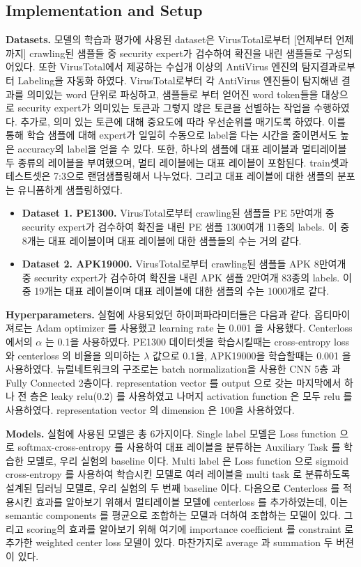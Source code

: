 \subsection{Implementation and Setup}
\textbf{Datasets. } 
모델의 학습과 평가에 사용된 dataset은 VirusTotal로부터 [언제부터 언제까지] crawling된 샘플들 중 security expert가 검수하여 확진을 내린 샘플들로 구성되어있다. 또한 VirusTotal에서 제공하는 수십개 이상의 AntiVirus 엔진의 탐지결과로부터 Labeling을 자동화 하였다. VirusTotal로부터 각 AntiVirus 엔진들이 탐지해낸 결과를 의미있는 word 단위로 파싱하고, 샘플들로 부터 얻어진 word token들을 대상으로 security expert가 의미있는 토큰과 그렇지 않은 토큰을 선별하는 작업을 수행하였다. 추가로, 의미 있는 토큰에 대해 중요도에 따라 우선순위를 매기도록 하였다. 이를 통해 학습 샘플에 대해 expert가 일일히 수동으로 label을 다는 시간을 줄이면서도 높은 accuracy의 label을 얻을 수 있다. 또한, 하나의 샘플에 대표 레이블과 멀티레이블 두 종류의 레이블을 부여했으며, 멀티 레이블에는 대표 레이블이 포함된다. train셋과 테스트셋은 7:3으로 랜덤샘플링해서 나누었다. 그리고 대표 레이블에 대한 샘플의 분포는 유니폼하게 샘플링하였다. 

\begin{itemize}
	\item{ \textbf{Dataset 1. PE1300. } VirusTotal로부터 crawling된 샘플들 PE 5만여개 중 security expert가 검수하여 확진을 내린 PE 샘플 1300여개 11종의 labels. 이 중 8개는 대표 레이블이며 대표 레이블에 대한 샘플들의 수는 거의 같다. 
	}
	\item{ \textbf{Dataset 2. APK19000. } VirusTotal로부터 crawling된 샘플들 APK 8만여개 중 security expert가 검수하여 확진을 내린 APK 샘플 2만여개 83종의 labels. 이 중 19개는 대표 레이블이며 대표 레이블에 대한 샘플의 수는 1000개로 같다. 
	}
\end{itemize}

\textbf{Hyperparameters. }
실험에 사용되었던 하이퍼파라미터들은 다음과 같다. 옵티마이져로는 Adam optimizer 를 사용했고 learning rate 는 0.001 을 사용했다. Centerloss 에서의 $\alpha$ 는 0.1을 사용하였다. PE1300 데이터셋을 학습시킬때는 cross-entropy loss 와 centerloss 의 비율을 의미하는 $\lambda$ 값으로 0.1을, APK19000을 학습할때는 0.001 을 사용하였다. 뉴럴네트워크의 구조로는 batch normalization을 사용한 CNN 5층 과 Fully Connected 2층이다. representation vector 를 output 으로 갖는 마지막에서 하나 전 층은 leaky relu(0.2) 를 사용하였고 나머지 activation function 은 모두 relu 를 사용하였다. representation vector 의 dimension 은 100을 사용하였다. 

\textbf{Models. }
실험에 사용된 모델은 총 6가지이다. Single label 모델은 Loss function 으로 softmax-cross-entropy 를 사용하여 대표 레이블을 분류하는 Auxiliary Task 를 학습한 모델로, 우리 실험의 baseline 이다. Multi label 은  Loss function 으로 sigmoid cross-entropy 를 사용하여 학습시킨 모델로 여러 레이블을 multi task 로 분류하도록 설계된 딥러닝 모델로, 우리 실험의 두 번째 baseline 이다. 다음으로 Centerloss 를 적용시킨 효과를 알아보기 위해서 멀티레이블 모델에 centerloss 를 추가하였는데, 이는 semantic components 를 평균으로 조합하는 모델과 더하여 조합하는 모델이 있다. 그리고 scoring의 효과를 알아보기 위해 여기에 importance coefficient 를 constraint 로 추가한 weighted center loss 모델이 있다. 마찬가지로 average 과 summation 두 버젼이 있다. 

